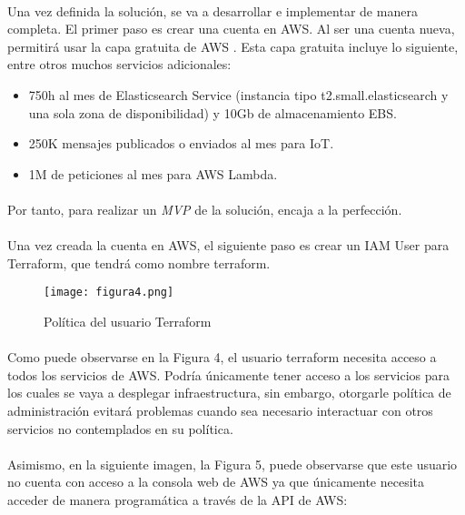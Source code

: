 \documentclass[../../memoria.tex]{subfiles}
\begin{document}
\paragraph{}
Una vez definida la solución, se va a desarrollar e implementar de manera completa. El primer paso es crear una cuenta en AWS. Al ser una cuenta nueva, permitirá usar la capa gratuita de AWS \cite{awsfreetier}. Esta capa gratuita incluye lo siguiente, entre otros muchos servicios adicionales:

\begin{itemize}
    \item 750h al mes de Elasticsearch Service (instancia tipo t2.small.elasticsearch y una sola zona de disponibilidad) y 10Gb de almacenamiento EBS.
    \item 250K mensajes publicados o enviados al mes para IoT.
    \item 1M de peticiones al mes para AWS Lambda.
\end{itemize}

\paragraph{}
Por tanto, para realizar un \textit{MVP} de la solución, encaja a la perfección.

\paragraph{}
Una vez creada la cuenta en AWS, el siguiente paso es crear un IAM User para Terraform, que tendrá como nombre terraform.

\begin{figure}[H]
    \centering
    \texttt{[image: figura4.png]}
    \caption{Política del usuario Terraform}
    \label{fig:figura4}
\end{figure}

\paragraph{}
Como puede observarse en la Figura 4, el usuario terraform necesita acceso a todos los servicios de AWS. Podría únicamente tener acceso a los servicios para los cuales se vaya a desplegar infraestructura, sin embargo, otorgarle política de administración evitará problemas cuando sea necesario interactuar con otros servicios no contemplados en su política.

\paragraph{}
Asimismo, en la siguiente imagen, la Figura 5, puede observarse que este usuario no cuenta con acceso a la consola web de AWS ya que únicamente necesita acceder de manera programática a través de la API de AWS:
\end{document}
